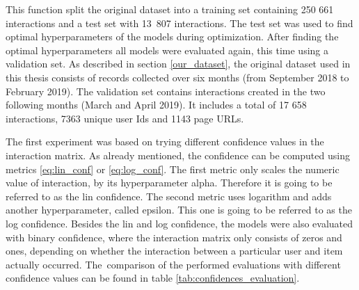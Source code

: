 This function split the original dataset into a training set containing 250 661 interactions and a test set with 13~807 interactions. The test set was used to find optimal hyperparameters of the models during optimization. After finding the optimal hyperparameters all models were evaluated again, this time using a validation set. As described in section \ref{our_dataset}, the original dataset used in this thesis consists of records collected over six months (from September 2018 to February 2019). The validation set contains interactions created in the two following months (March and April 2019). It includes a total of 17 658 interactions, 7363 unique user Ids and 1143 page URLs. 

The first experiment was based on trying different confidence values in the interaction matrix. As already mentioned, the confidence can be computed using metrics \ref{eq:lin_conf} or \ref{eq:log_conf}. The first metric only scales the numeric value of interaction, by its hyperparameter alpha. Therefore it is going to be referred to as the lin confidence. The second metric uses logarithm and adds another hyperparameter, called epsilon. This one is going to be referred to as the log confidence. Besides the lin and log confidence, the models were also evaluated with binary confidence, where the interaction matrix only consists of zeros and ones, depending on whether the interaction between a particular user and item actually occurred. The~comparison of the performed evaluations with different confidence values can be found in table \ref{tab:confidences_evaluation}. 
